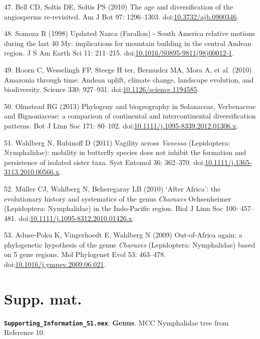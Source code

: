 \documentclass[10pt]{article}
\begin{document}
47. Bell CD, Soltis DE, Soltis PS (2010) The age and diversification of
the angiosperms re-revisited. Am J Bot 97: 1296--1303.
doi:\href{http://dx.doi.org/10.3732/ajb.0900346}{10.3732/ajb.0900346}.

48. Somoza R (1998) Updated Nazca (Farallon) - South America relative
motions during the last 40 My: implications for mountain building in the
central Andean region. J S Am Earth Sci 11: 211--215.
doi:\href{http://dx.doi.org/10.1016/S0895-9811(98)00012-1}{10.1016/S0895-9811(98)00012-1}.

49. Hoorn C, Wesselingh FP, Steege H ter, Bermudez MA, Mora A, et al.
(2010) Amazonia through time: Andean uplift, climate change, landscape
evolution, and biodiversity. Science 330: 927--931.
doi:\href{http://dx.doi.org/10.1126/science.1194585}{10.1126/science.1194585}.

50. Olmstead RG (2013) Phylogeny and biogeography in Solanaceae,
Verbenaceae and Bignoniaceae: a comparison of continental and
intercontinental diversification patterns. Bot J Linn Soc 171: 80--102.
doi:\href{http://dx.doi.org/10.1111/j.1095-8339.2012.01306.x}{10.1111/j.1095-8339.2012.01306.x}.

51. Wahlberg N, Rubinoff D (2011) Vagility across \textit{Vanessa} (Lepidoptera:
Nymphalidae): mobility in butterfly species does not inhibit the
formation and persistence of isolated sister taxa. Syst Entomol 36:
362--370.
doi:\href{http://dx.doi.org/10.1111/j.1365-3113.2010.00566.x}{10.1111/j.1365-3113.2010.00566.x}.

52. M\"uller CJ, Wahlberg N, Beheregaray LB (2010) `After Africa': the
evolutionary history and systematics of the genus \textit{Charaxes} Ochsenheimer
(Lepidoptera: Nymphalidae) in the Indo-Pacific region. Biol J Linn Soc
100: 457--481.
doi:\href{http://dx.doi.org/10.1111/j.1095-8312.2010.01426.x}{10.1111/j.1095-8312.2010.01426.x}.

53. Aduse-Poku K, Vingerhoedt E, Wahlberg N (2009) Out-of-Africa again:
a phylogenetic hypothesis of the genus \textit{Charaxes} (Lepidoptera:
Nymphalidae) based on 5 gene regions. Mol Phylogenet Evol 53: 463--478.
doi:\href{http://dx.doi.org/10.1016/j.ympev.2009.06.021}{10.1016/j.ympev.2009.06.021}.




\section*{Supp. mat.}

\textbf{\texttt{Supporting_Information_S1.nex}}: \textbf{Genus}. MCC Nymphalidae tree from
Reference 10.
\end{document}
